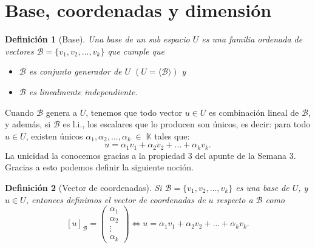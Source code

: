 \documentclass[12pt]{book}
\newtheorem{defi}{Definici\'on}
\def\K{\mathbb{K}}
\def\B{\mathcal{B}}
\begin{document}
\section{Base, coordenadas y dimensión}


\begin{defi}[Base] Una \emph{base de un sub espacio $U$} es una \emph{familia ordenada} de vectores $\B=\{v_1,v_2,...,v_k\}$ que cumple que
    \begin{itemize} 
    \item $\B$ es conjunto generador de $U$ $(U=\langle\B\rangle)$ y
    \item $\B$ es linealmente independiente.
    \end{itemize}   
\end{defi}

Cuando $\B$ genera a $U$, tenemos que todo vector $u\in U$ es combinación lineal de $\B$, y además, si $\B$ es l.i., los escalares que lo producen son únicos, es decir: para todo $u\in U$, existen \'unicos $\alpha_1,\alpha_2,...,\alpha_k\;\in\;\K$ tales que:
     $$u=\alpha_1v_1+\alpha_2v_2+\dots+\alpha_kv_k.$$  
La unicidad la conocemos gracias a la propiedad 3 del apunte de la Semana 3.
Gracias a esto podemos definir la siguiente noción.

\begin{defi}[Vector de coordenadas] 
    Si $\B=\{v_1,v_2,...,v_k\}$ es una base de $U$, y $u\in U$, entonces definimos el vector de coordenadas de $u$ respecto a $\B$ como 
    $$[u]_{\B}=\left( \begin{array}{c}\alpha_1 \\\alpha_2 \\\vdots \\\alpha_k\end{array} \right) \Leftrightarrow u=\alpha_1v_1+\alpha_2v_2+\dots+\alpha_kv_k.$$
\end{defi}
\end{document}
